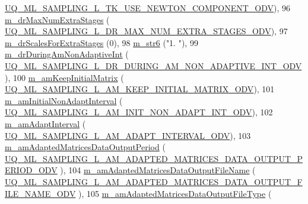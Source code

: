 \begin{DoxyCode}
      \hyperlink{_m_l_sampling_level_options_8h_a2027707406e5493bfc0702cb3033ce82}{UQ\_ML\_SAMPLING\_L\_TK\_USE\_NEWTON\_COMPONENT\_ODV}),
96   \hyperlink{class_q_u_e_s_o_1_1_m_l_sampling_level_options_ab854494640bb98cad74ee656e62daab3}{m\_drMaxNumExtraStages}                      (
      \hyperlink{_m_l_sampling_level_options_8h_aa5bfeef6f4cf71334313ef04931d90fc}{UQ\_ML\_SAMPLING\_L\_DR\_MAX\_NUM\_EXTRA\_STAGES\_ODV}),
97   \hyperlink{class_q_u_e_s_o_1_1_m_l_sampling_level_options_ab4bdcc9166bc8cdbc9f5915dcb77e34a}{m\_drScalesForExtraStages}                   (0),
98   \hyperlink{class_q_u_e_s_o_1_1_m_l_sampling_level_options_a57c51b01f2dd9dcf3ae13a6891c72b78}{m\_str6}                                     (\textcolor{stringliteral}{"1. "}),
99   \hyperlink{class_q_u_e_s_o_1_1_m_l_sampling_level_options_a0824b7f76b5a6ee901f6a5edc0e130b8}{m\_drDuringAmNonAdaptiveInt}                 (
      \hyperlink{_m_l_sampling_level_options_8h_a5eae7f902d5e4947bd3423fc90414642}{UQ\_ML\_SAMPLING\_L\_DR\_DURING\_AM\_NON\_ADAPTIVE\_INT\_ODV}),
100   \hyperlink{class_q_u_e_s_o_1_1_m_l_sampling_level_options_a9adec09f474c263078450c6ad66518e5}{m\_amKeepInitialMatrix}                      (
      \hyperlink{_m_l_sampling_level_options_8h_a0a7527161362b944fbe56ac7d4560de9}{UQ\_ML\_SAMPLING\_L\_AM\_KEEP\_INITIAL\_MATRIX\_ODV}),
101   \hyperlink{class_q_u_e_s_o_1_1_m_l_sampling_level_options_a75d028be834232b634bf5a23dcc73ed1}{m\_amInitialNonAdaptInterval}                (
      \hyperlink{_m_l_sampling_level_options_8h_a27b8503335df621c186ea19b986ab672}{UQ\_ML\_SAMPLING\_L\_AM\_INIT\_NON\_ADAPT\_INT\_ODV}),
102   \hyperlink{class_q_u_e_s_o_1_1_m_l_sampling_level_options_abf7bc1e5bb55727e5c92bec2e49974a6}{m\_amAdaptInterval}                          (
      \hyperlink{_m_l_sampling_level_options_8h_ae49697aa6afd01515cb3f68ab932d606}{UQ\_ML\_SAMPLING\_L\_AM\_ADAPT\_INTERVAL\_ODV}),
103   \hyperlink{class_q_u_e_s_o_1_1_m_l_sampling_level_options_a8c7ce073c75774afdbffa1ba3674085c}{m\_amAdaptedMatricesDataOutputPeriod}        (
      \hyperlink{_m_l_sampling_level_options_8h_a9db211b4afa7ee39c65d585e4e32d2c1}{UQ\_ML\_SAMPLING\_L\_AM\_ADAPTED\_MATRICES\_DATA\_OUTPUT\_PERIOD\_ODV}
      ),
104   \hyperlink{class_q_u_e_s_o_1_1_m_l_sampling_level_options_a7dde9af112143992a87a72635e63a864}{m\_amAdaptedMatricesDataOutputFileName}      (
      \hyperlink{_m_l_sampling_level_options_8h_a81a53ad0bdd7f7a72be30f20486d6aed}{UQ\_ML\_SAMPLING\_L\_AM\_ADAPTED\_MATRICES\_DATA\_OUTPUT\_FILE\_NAME\_ODV}
      ),
105   \hyperlink{class_q_u_e_s_o_1_1_m_l_sampling_level_options_ab209a7f5dac6c2b4e108a7a1829631c6}{m\_amAdaptedMatricesDataOutputFileType}      (

\end{DoxyCode}
